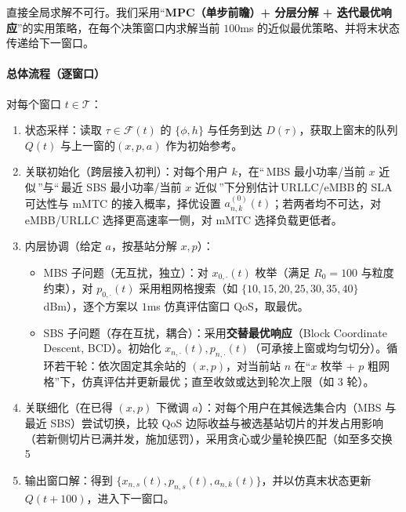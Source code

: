 直接全局求解不可行。我们采用“\textbf{MPC（单步前瞻）+ 分层分解 + 迭代最优响应}”的实用策略，在每个决策窗口内求解当前 $100$ms 的近似最优策略、并将末状态传递给下一窗口。

\paragraph{总体流程（逐窗口）}
对每个窗口 $t\in\mathcal{T}$：
\begin{enumerate}
  \item 状态采样：读取 $\tau\in\mathcal{F}(t)$ 的 $\{\phi, h\}$ 与任务到达 $D(\tau)$，获取上窗末的队列 $Q(t)$ 与上一窗的$(x,p,a)$ 作为初始参考。
  \item 关联初始化（跨层接入初判）：对每个用户 $k$，在“\,MBS 最小功率/当前 $x$ 近似\,”与“\,最近 SBS 最小功率/当前 $x$ 近似\,”下分别估计\,URLLC/eMBB\,的 SLA 可达性与 mMTC 的接入概率，择优设置 $a^{(0)}_{n,k}(t)$；若两者均不可达，对 eMBB/URLLC 选择更高速率一侧，对 mMTC 选择负载更低者。
  \item 内层协调（给定 $a$，按基站分解 $x,p$）：
  \begin{itemize}
    \item MBS 子问题（无互扰，独立）：对 $x_{0,\cdot}(t)$ 枚举（满足 $R_0=100$ 与粒度约束），对 $p_{0,\cdot}(t)$ 采用粗网格搜索（如 $\{10,15,20,25,30,35,40\}$ dBm），逐个方案以 $1$ms 仿真评估窗口 QoS，取最优。
    \item SBS 子问题（存在互扰，耦合）：采用\textbf{交替最优响应}（Block Coordinate Descent, BCD）。初始化 $x_{n,\cdot}(t),p_{n,\cdot}(t)$（可承接上窗或均匀切分）。循环若干轮：依次固定其余站的 $(x,p)$，对当前站 $n$ 在“$x$ 枚举 + $p$ 粗网格”下，仿真评估并更新最优；直至收敛或达到轮次上限（如 3 轮）。
  \end{itemize}
  \item 关联细化（在已得 $(x,p)$ 下微调 $a$）：对每个用户在其候选集合内（MBS 与最近 SBS）尝试切换，比较 QoS 边际收益与被选基站切片的并发占用影响（若新侧切片已满并发，施加惩罚），采用贪心或少量轮换匹配（如至多交换 5%
  \item 输出窗口解：得到 $\{x_{n,s}(t),p_{n,s}(t),a_{n,k}(t)\}$，并以仿真末状态更新 $Q(t+100)$，进入下一窗口。
\end{enumerate}


